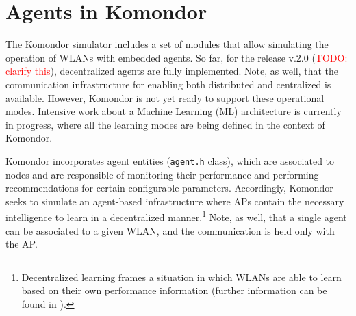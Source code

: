 \documentclass[a4paper]{article}
\begin{document}
%	
%
%


\section{Agents in Komondor}
\label{section:agents}
The Komondor simulator includes a set of modules that allow simulating the operation of WLANs with embedded agents. So far, for the release v.2.0 (\textcolor{red}{TODO: clarify this}), decentralized agents are fully implemented. Note, as well, that the communication infrastructure for enabling both distributed and centralized is available. However, Komondor is not yet ready to support these operational modes. Intensive work about a Machine Learning (ML) architecture is currently in progress, where all the learning modes are being defined in the context of Komondor. 

Komondor incorporates agent entities (\texttt{agent.h} class), which are associated to nodes and are responsible of monitoring their performance and performing recommendations for certain configurable parameters. Accordingly, Komondor seeks to simulate an agent-based infrastructure where APs contain the necessary intelligence to learn in a decentralized manner.\footnote{Decentralized learning frames a situation in which WLANs are able to learn based on their own performance information (further information can be found in \cite{wilhelmi2017implications, wilhelmi2017collaborative, wilhelmi2018potential}).} Note, as well, that a single agent can be associated to a given WLAN, and the communication is held only with the AP.
\end{document}
